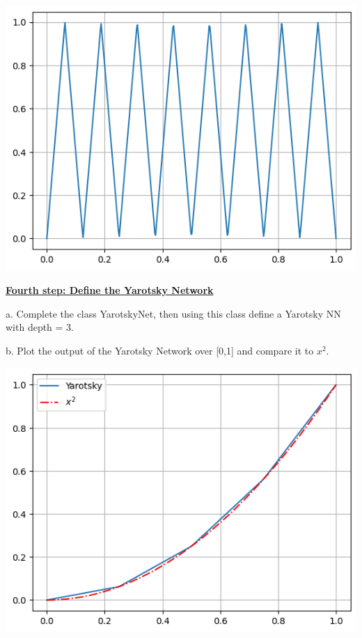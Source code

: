 \documentclass{article}
\newcommand{\step}[1]{\underline{\textbf{\large{#1}}} }
\begin{document}
    \begin{center}\includegraphics[scale = 0.5]{plot_concatenate.png}\end{center}

\begin{center}\step{Fourth step: Define the Yarotsky Network}\end{center}

    a. Complete the class YarotskyNet, then using this class define
    a Yarotsky NN with depth = 3.
  

    b. Plot the output of the Yarotsky Network over [0,1] and compare it to $x^2$.

    \begin{center}\includegraphics[scale = 0.5]{Yarotsky_comparison.png}\end{center}
\end{document}
